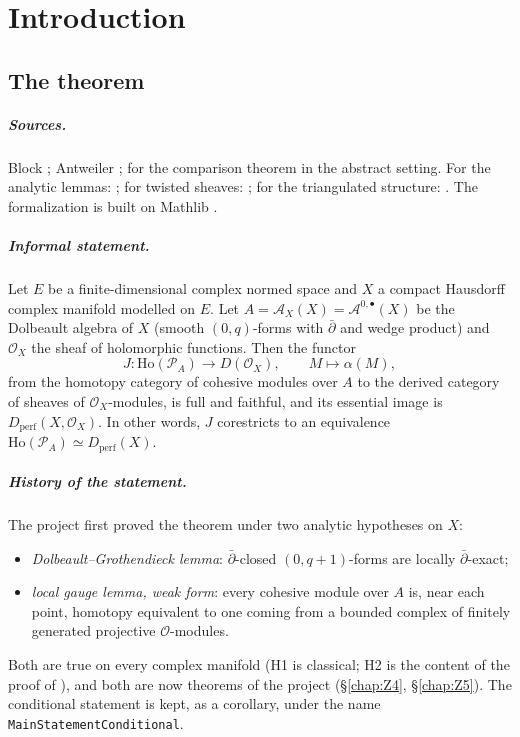 \chapter{Introduction}\label{chap:intro}
\section{The theorem}

\paragraph{Sources.} Block \cite[Thm~4.1.3]{B}; Antweiler \cite[Thm~7.2.20 and Thm~7.4.3]{A};
\cite{CHL} for the comparison theorem in the abstract setting. For the analytic lemmas:
\cite{Hor, GH, DK, BSW}; for twisted sheaves: \cite{Cal, Toda}; for the triangulated structure:
\cite{BK}. The formalization is built on Mathlib \cite{Mathlib}.

\paragraph{Informal statement.} Let $E$ be a finite-dimensional complex normed space and $X$ a
compact Hausdorff complex manifold modelled on $E$. Let $A={\mathcal{A}}_X(X)={\mathcal{A}}^{0,\bullet}(X)$ be the
Dolbeault algebra of $X$ (smooth $(0,q)$-forms with ${\bar\partial}$ and wedge product) and ${\mathcal{O}}_X$ the
sheaf of holomorphic functions. Then the functor
\[ J\colon {\mathrm{Ho}}(\mathcal P_A)\longrightarrow D({\mathcal{O}}_X),\qquad M\longmapsto \alpha(M), \]
from the homotopy category of cohesive modules over $A$ to the derived category of sheaves of
${\mathcal{O}}_X$-modules, is full and faithful, and its essential image is ${D_{\mathrm{perf}}}(X,{\mathcal{O}}_X)$. In other
words, $J$ corestricts to an equivalence ${\mathrm{Ho}}(\mathcal P_A)\simeq{D_{\mathrm{perf}}}(X)$.

\paragraph{History of the statement.} The project first proved the theorem under two analytic
hypotheses on $X$:
\begin{itemize}
\item[(H1)] \emph{Dolbeault--Grothendieck lemma}: ${\bar\partial}$-closed $(0,q{+}1)$-forms are locally
${\bar\partial}$-exact;
\item[(H2)] \emph{local gauge lemma, weak form}: every cohesive module over $A$ is, near each
point, homotopy equivalent to one coming from a bounded complex of finitely generated projective
${\mathcal{O}}$-modules.
\end{itemize}
Both are true on every complex manifold (H1 is classical; H2 is the content of the proof of
\cite[Lemma~4.1.5]{B}), and both are now theorems of the project (\S\ref{chap:Z4}, \S\ref{chap:Z5}). The
conditional statement is kept, as a corollary, under the name \texttt{MainStatementConditional}.

